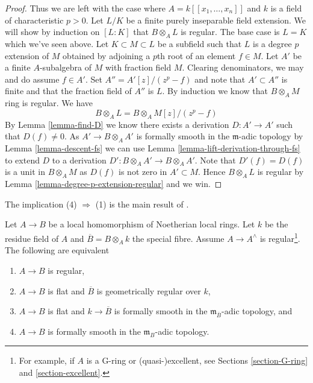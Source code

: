 \begin{proof}
\medskip\noindent
Thus we are left with the case where $A = k[[x_1, \ldots, x_n]]$
and $k$ is a field of characteristic $p > 0$.
Let $L/K$ be a finite purely inseparable field extension.
We will show by induction on $[L : K]$ that $B \otimes_A L$
is regular. The base case is $L = K$ which we've seen above.
Let $K \subset M \subset L$ be a subfield such that
$L$ is a degree $p$ extension of $M$ obtained by adjoining a $p$th root
of an element $f \in M$. Let $A'$ be a finite $A$-subalgebra
of $M$ with fraction field $M$. Clearing denominators, we may and do assume
$f \in A'$. Set $A'' = A'[z]/(z^p -f)$ and note that $A' \subset A''$
is finite and that the fraction field of $A''$ is $L$.
By induction we know that $B \otimes_A M$ ring is regular.
We have
$$
B \otimes_A L = B \otimes_A M[z]/(z^p - f)
$$
By Lemma \ref{lemma-find-D} we know there exists a derivation
$D : A' \to A'$ such that $D(f) \not = 0$. As $A' \to B \otimes_A A'$
is formally smooth in the $\mathfrak m$-adic topology by
Lemma \ref{lemma-descent-fs}
we can use
Lemma \ref{lemma-lift-derivation-through-fs}
to extend $D$ to a derivation $D' : B \otimes_A A' \to B \otimes_A A'$.
Note that $D'(f) = D(f)$ is a unit in $B \otimes_A M$ as $D(f)$
is not zero in $A' \subset M$. Hence $B \otimes_A L$ is regular by
Lemma \ref{lemma-degree-p-extension-regular} and we win.
\end{proof}

\begin{theorem}[Andr\'e]
\label{theorem-fs-regular}
\begin{reference}
The implication (4) $\Rightarrow$ (1) is the main result of \cite{Andre-smooth}.
\end{reference}
Let $A \to B$ be a local homomorphism of Noetherian local rings.
Let $k$ be the residue field of $A$ and $\overline{B} = B \otimes_A k$
the special fibre. Assume $A \to A^\wedge$ is regular\footnote{For example,
if $A$ is a G-ring or (quasi-)excellent, see Sections \ref{section-G-ring} and
\ref{section-excellent}.}.
The following are equivalent
\begin{enumerate}
\item $A \to B$ is regular,
\item $A \to B$ is flat and $\overline{B}$ is geometrically regular
over $k$,
\item $A \to B$ is flat and $k \to \overline{B}$ is formally smooth
in the $\mathfrak m_{\overline{B}}$-adic topology, and
\item $A \to B$ is formally smooth in the $\mathfrak m_B$-adic
topology.
\end{enumerate}
\end{theorem}

